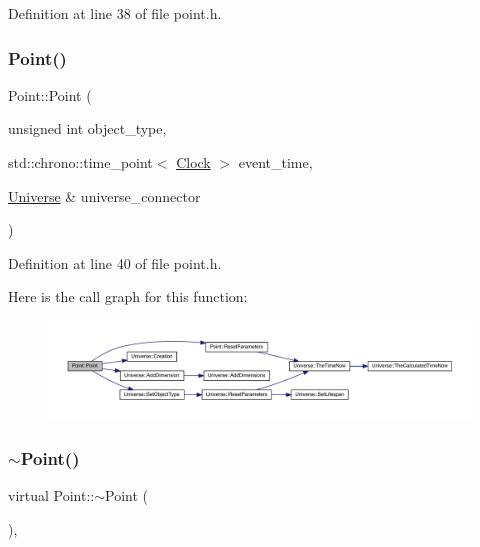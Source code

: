 Definition at line 38 of file point.\+h.

\mbox{\label{class_point_abbc76ed1b437c982eb607ec165ecfa47}} 
\subsubsection{\texorpdfstring{Point()}{Point()}\hspace{0.1cm}{\footnotesize\ttfamily [4/4]}}
{\footnotesize\ttfamily Point\+::\+Point (\begin{DoxyParamCaption}\item[{unsigned int}]{object\+\_\+type,  }\item[{std\+::chrono\+::time\+\_\+point$<$ \mbox{\hyperlink{universe_8h_a0ef8d951d1ca5ab3cfaf7ab4c7a6fd80}{Clock}} $>$}]{event\+\_\+time,  }\item[{\mbox{\hyperlink{class_universe}{Universe}} \&}]{universe\+\_\+connector }\end{DoxyParamCaption})\hspace{0.3cm}{\ttfamily [inline]}}



Definition at line 40 of file point.\+h.

Here is the call graph for this function\+:\nopagebreak
\begin{figure}[H]
\begin{center}
\leavevmode
\includegraphics[width=350pt]{class_point_abbc76ed1b437c982eb607ec165ecfa47_cgraph}
\end{center}
\end{figure}
\mbox{\label{class_point_a364091762d6aa1aa5983d36fd7d8b6d5}} 
\subsubsection{\texorpdfstring{$\sim$\+Point()}{~Point()}}
{\footnotesize\ttfamily virtual Point\+::$\sim$\+Point (\begin{DoxyParamCaption}{ }\end{DoxyParamCaption})\hspace{0.3cm}{\ttfamily [inline]}, {\ttfamily [virtual]}}

